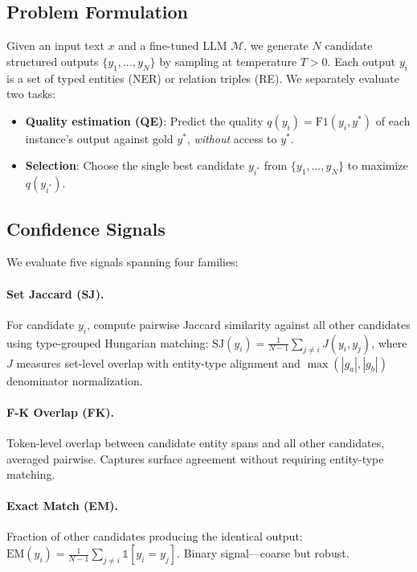 \documentclass[11pt,twocolumn]{article}
\begin{document}
\subsection{Problem Formulation}

Given an input text $x$ and a fine-tuned LLM $\mathcal{M}$, we generate $N$ candidate structured outputs $\{y_1, \ldots, y_N\}$ by sampling at temperature $T{>}0$.
Each output $y_i$ is a set of typed entities (NER) or relation triples (RE).
We separately evaluate two tasks:
\begin{itemize}
\item \textbf{Quality estimation (QE)}: Predict the quality $q(y_i) = \text{F1}(y_i, y^*)$ of each instance's output against gold $y^*$, \emph{without} access to $y^*$.
\item \textbf{Selection}: Choose the single best candidate $y_{i^*}$ from $\{y_1, \ldots, y_N\}$ to maximize $q(y_{i^*})$.
\end{itemize}

\subsection{Confidence Signals}

We evaluate five signals spanning four families:

\paragraph{Set Jaccard (SJ).}
For candidate $y_i$, compute pairwise Jaccard similarity against all other candidates using type-grouped Hungarian matching:
$\text{SJ}(y_i) = \frac{1}{N-1} \sum_{j \neq i} J(y_i, y_j)$,
where $J$ measures set-level overlap with entity-type alignment and $\max(|g_a|, |g_b|)$ denominator normalization.

\paragraph{F-K Overlap (FK).}
Token-level overlap between candidate entity spans and all other candidates, averaged pairwise.
Captures surface agreement without requiring entity-type matching.

\paragraph{Exact Match (EM).}
Fraction of other candidates producing the identical output: $\text{EM}(y_i) = \frac{1}{N-1} \sum_{j \neq i} \mathbb{1}[y_i = y_j]$.
Binary signal---coarse but robust.
\end{document}
